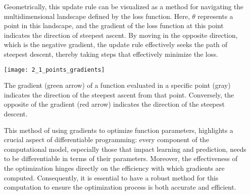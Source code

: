 Geometrically, this update rule can be visualized as a method for navigating
the multidimensional landscape defined by the loss function. Here, $\theta$
represents a point in this landscape, and the gradient of the loss function at
this point indicates the direction of steepest ascent. By moving in the
opposite direction, which is the negative gradient, the update rule effectively
seeks the path of steepest descent, thereby taking steps that effectively
minimize the loss.

\begin{marginfigure}
  \texttt{[image: 2\_1\_points\_gradients]}
  \caption[Gradient and Loss]{The gradient (green arrow) of a function evaluated
  in a specific point (gray) indicates the direction of the steepest ascent from
  that point. Conversely, the opposite of the gradient (red arrow) indicates the
  direction of the steepest descent. }
\end{marginfigure}

This method of using gradients to optimize function parameters, highlights a
crucial aspect of differentiable programming: every component of the
computational model, especially those that impact learning and prediction,
needs to be differentiable in terms of their parameters. Moreover, the
effectiveness of the optimization hinges directly on the efficiency with which
gradients are computed. Consequently, it is essential to have a robust method
for this computation to ensure the optimization process is both accurate and
efficient.

